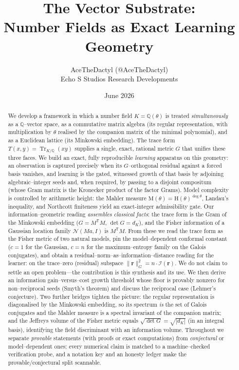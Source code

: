 \documentclass[11pt]{article}
\title{\textbf{The Vector Substrate:\\ Number Fields as Exact Learning Geometry}}
\author{AceTheDactyl (@AceTheDactyl)\\ Echo S Studios Research Developments}
\date{June 2026}
\theoremstyle{plain}
\theoremstyle{definition}
\theoremstyle{remark}
\newcommand{\Q}{\mathbb{Q}}
\newcommand{\K}{K}
\newcommand{\Tr}{\operatorname{Tr}}
\newcommand{\Mah}{\mathrm{M}}
\newcommand{\height}{\mathrm{H}}
\newcommand{\Fish}{\mathcal{I}}
\newcommand{\rr}{\mathbf{r}}
\newcommand{\GG}{G}
\newcommand{\transpose}{^{\mathsf{T}}}
\begin{document}
\maketitle

\begin{abstract}
We develop a framework in which a number field $\K=\Q(\theta)$ is treated \emph{simultaneously} as a
$\Q$--vector space, as a commutative matrix algebra (its regular representation, with multiplication by
$\theta$ realised by the companion matrix of the minimal polynomial), and as a Euclidean lattice (its
Minkowski embedding). The trace form $T(x,y)=\Tr_{\K/\Q}(xy)$ supplies a single, exact, rational metric
$\GG$ that unifies these three faces. We build an exact, fully reproducible \emph{learning} apparatus on
this geometry: an observation is captured precisely when its $\GG$--orthogonal residual against a forced
basis vanishes, and learning is the gated, witnessed growth of that basis by adjoining algebraic--integer
seeds and, when required, by passing to a disjoint compositum (whose Gram matrix is the Kronecker product
of the factor Grams). Model complexity is controlled by arithmetic height: the Mahler measure
$\Mah(\theta)=\height(\theta)^{\deg\theta}$, Landau's inequality, and Northcott finiteness yield an
exact-integer admissibility gate. Our information--geometric reading \emph{assembles classical facts}: the
trace form is the Gram of the Minkowski embedding ($\GG=M\transpose M$, $\det\GG=d_\K$), and the Fisher
information of a Gaussian location family $\mathcal N(Ma,I)$ is $M\transpose M$. From these we read the trace
form as the Fisher metric of two natural models, pin the model--dependent conformal constant ($c=1$ for the
Gaussian, $c=n$ for the maximum--entropy family on the Galois conjugates), and obtain a
residual--norm--as--information--distance reading for the learner: on the trace--zero (residual) subspace
$\lVert\rr\rVert_{\GG}^2=n\cdot\Fish(\rr)$. We do not claim to settle an open problem---the contribution is
this synthesis and its use. We then derive an information gain--versus--cost growth threshold whose floor is
provably nonzero for non--reciprocal seeds (Smyth's theorem) and discuss the reciprocal case (Lehmer's
conjecture). Two further bridges tighten the picture: the regular representation is
diagonalised by the Minkowski embedding, so its spectrum \emph{is} the set of Galois conjugates and the
Mahler measure is a spectral invariant of the companion matrix; and the Jeffreys volume of the Fisher
metric equals $\sqrt{\det\GG}=\sqrt{|d_\K|}$ (in an integral basis), identifying the field discriminant with
an information volume.
Throughout we separate \emph{provable} statements (with proofs or exact computations) from \emph{conjectural}
or model--dependent ones; every numerical claim is matched to a machine--checked verification probe, and a
notation key and an honesty ledger make the provable/conjectural split scannable.
\end{abstract}
\end{document}
